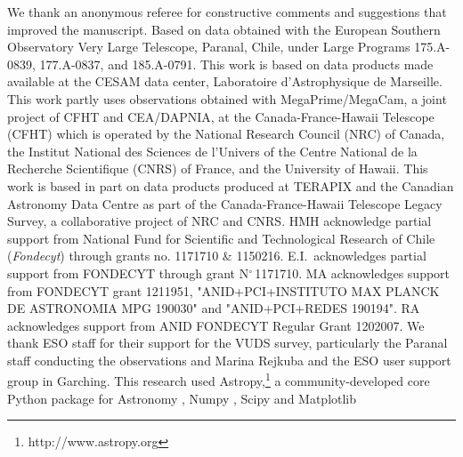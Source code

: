 \documentclass[longauth]{aa}
\begin{document}


\begin{acknowledgements}
        We thank an anonymous referee for constructive comments and
        suggestions that improved the manuscript. Based on data obtained with
        the European Southern Observatory Very Large Telescope, Paranal,
        Chile, under Large Programs 175.A-0839, 177.A-0837, and 185.A-0791.
        This work is based on data products made available at the CESAM data
        center, Laboratoire d'Astrophysique de Marseille. This work partly
        uses observations obtained with MegaPrime/MegaCam, a joint project of
        CFHT and CEA/DAPNIA, at the Canada-France-Hawaii Telescope
        (CFHT) which is operated by the National Research Council (NRC) of
        Canada, the Institut National des Sciences de l'Univers of the Centre
        National de la Recherche Scientifique (CNRS) of France, and the
        University of Hawaii. This work is based in part on data products
        produced at TERAPIX and the Canadian Astronomy Data Centre as part of
        the Canada-France-Hawaii Telescope Legacy Survey, a collaborative
        project of NRC and CNRS. HMH acknowledge partial support from
        National Fund for Scientific and Technological Research of Chile
        (\emph{Fondecyt}) through grants no. 1171710 \& 1150216. E.I.\
        acknowledges partial support from FONDECYT through grant
        N$^\circ$\,1171710. MA acknowledges support from FONDECYT grant
        1211951, "ANID+PCI+INSTITUTO MAX PLANCK DE ASTRONOMIA MPG 190030"
        and "ANID+PCI+REDES 190194". RA acknowledges support from ANID
        FONDECYT Regular Grant 1202007. We thank ESO staff for their support
        for the VUDS survey, particularly the Paranal staff conducting the
        observations and Marina Rejkuba and the ESO user support group in
        Garching. This research used Astropy,\footnote
        {http://www.astropy.org} a community-developed core Python package
        for Astronomy \citep{astropy:2013, astropy:2018}, Numpy \citep
        {numpy:2020}, Scipy \citep{SciPy:2020} and Matplotlib \citep
        {matplotlib:2007}
\end{acknowledgements}
\end{document}
